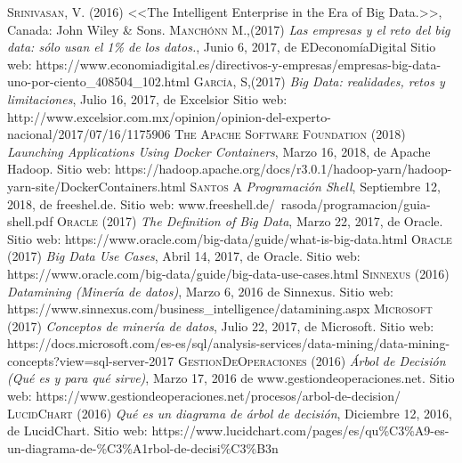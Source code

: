 \begin{thebibliography}{}
	 \textsc{Srinivasan, V.} (2016)
	<<The Intelligent Enterprise in the Era of Big Data.>>,
	Canada: John Wiley \& Sons.
	 \textsc{Manchónn M.},(2017)
	\textit{ Las empresas y el reto del big data: sólo usan el 1\% de los datos.},  Junio 6, 2017, de EDeconomíaDigital
	Sitio web: https://www.economiadigital.es/directivos-y-empresas/empresas-big-data-uno-por-ciento\_408504\_102.html
	 \textsc{García, S},(2017)
	\textit{Big Data: realidades, retos y limitaciones}, Julio 16, 2017, de Excelsior Sitio web:
	http://www.excelsior.com.mx/opinion/opinion-del-experto-nacional/2017/07/16/1175906	
	 \textsc{The Apache Software Foundation} (2018)
	\textit{Launching Applications Using Docker Containers}, Marzo 16, 2018, de Apache Hadoop. Sitio web: https://hadoop.apache.org/docs/r3.0.1/hadoop-yarn/hadoop-yarn-site/DockerContainers.html
	 \textsc{Santos A}
	\textit{Programación Shell}, Septiembre 12, 2018, de freeshel.de. Sitio web: www.freeshell.de/~rasoda/programacion/guia-shell.pdf
	 \textsc{Oracle} (2017) \textit{The Definition of Big Data}, Marzo 22, 2017, de Oracle. Sitio web: https://www.oracle.com/big-data/guide/what-is-big-data.html
	 \textsc{Oracle} (2017) \textit{Big Data Use Cases}, Abril 14, 2017, de Oracle. Sitio web: https://www.oracle.com/big-data/guide/big-data-use-cases.html
	 \textsc{Sinnexus} (2016) \textit{Datamining (Minería de datos)}, Marzo 6, 2016 de Sinnexus. Sitio web: https://www.sinnexus.com/business\_intelligence/datamining.aspx
	 \textsc{Microsoft} (2017) \textit{Conceptos de minería de datos}, Julio 22, 2017, de Microsoft. Sitio web: https://docs.microsoft.com/es-es/sql/analysis-services/data-mining/data-mining-concepts?view=sql-server-2017
	 \textsc{GestionDeOperaciones} (2016) \textit{Árbol de Decisión (Qué es y para qué sirve)}, Marzo 17, 2016 de www.gestiondeoperaciones.net. Sitio web: https://www.gestiondeoperaciones.net/procesos/arbol-de-decision/
	 \textsc{LucidChart} (2016) \textit{Qué es un diagrama de árbol de decisión}, Diciembre 12, 2016, de LucidChart. Sitio web: https://www.lucidchart.com/pages/es/qu\%C3\%A9-es-un-diagrama-de-\%C3\%A1rbol-de-decisi\%C3\%B3n

\end{thebibliography}
